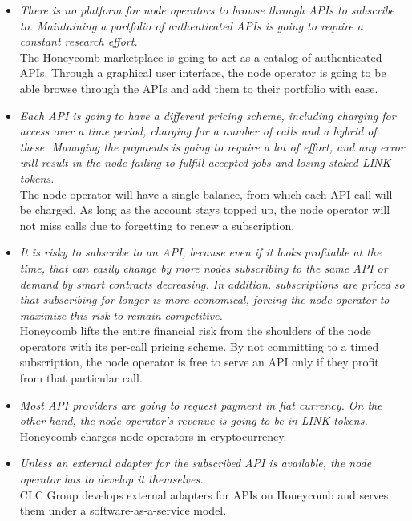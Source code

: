 \documentclass[12pt]{article}
\begin{document}
\begin{itemize}
	\item \textit{There is no platform for node operators to browse through APIs to subscribe to.
	Maintaining a portfolio of authenticated APIs is going to require a constant research effort.}\medskip\\
	The Honeycomb marketplace is going to act as a catalog of authenticated APIs.
	Through a graphical user interface, the node operator is going to be able browse through the APIs and add them to their portfolio with ease.
	
	\item \textit{Each API is going to have a different pricing scheme, including charging for access over a time period, charging for a number of calls and a hybrid of these.
	Managing the payments is going to require a lot of effort, and any error will result in the node failing to fulfill accepted jobs and losing staked LINK tokens.}\medskip\\
	The node operator will have a single balance, from which each API call will be charged.
	As long as the account stays topped up, the node operator will not miss calls due to forgetting to renew a subscription.
	
	\item \textit{It is risky to subscribe to an API, because even if it looks profitable at the time, that can easily change by more nodes subscribing to the same API or demand by smart contracts decreasing.
	In addition, subscriptions are priced so that subscribing for longer is more economical, forcing the node operator to maximize this risk to remain competitive.}\medskip\\
	Honeycomb lifts the entire financial risk from the shoulders of the node operators with its per-call pricing scheme.
	By not committing to a timed subscription, the node operator is free to serve an API only if they profit from that particular call.
	
	\item \textit{Most API providers are going to request payment in fiat currency.
	On the other hand, the node operator’s revenue is going to be in LINK tokens.}\medskip\\
	Honeycomb charges node operators in cryptocurrency.
	
	\item \textit{Unless an external adapter for the subscribed API is available, the node operator has to develop it themselves.}\medskip\\
	CLC Group develops external adapters for APIs on Honeycomb and serves them under a software-as-a-service model.
	

\end{itemize}
\end{document}
